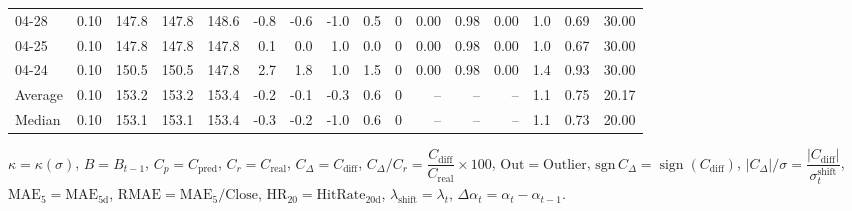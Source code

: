 \begin{threeparttable}
{\begin{tabular}{lrrrrrrrrrrrrrrr}
  04-28 &     0.10 & 147.8 & 147.8 & 148.6 &       -0.8 &           -0.6 &                     -1.0 &                 0.5 &              0 &       0.00 &      0.98 &           0.00 &              1.0 &            0.69 &                  30.00 \\
  04-25 &     0.10 & 147.8 & 147.8 & 147.8 &        0.1 &            0.0 &                      1.0 &                 0.0 &              0 &       0.00 &      0.98 &           0.00 &              1.0 &            0.67 &                  30.00 \\
  04-24 &     0.10 & 150.5 & 150.5 & 147.8 &        2.7 &            1.8 &                      1.0 &                 1.5 &              0 &       0.00 &      0.98 &           0.00 &              1.4 &            0.93 &                  30.00 \\
Average &     0.10 & 153.2 & 153.2 & 153.4 &       -0.2 &           -0.1 &                     -0.3 &                 0.6 &              0 &         -- &        -- &             -- &              1.1 &            0.75 &                  20.17 \\
 Median &     0.10 & 153.1 & 153.1 & 153.4 &       -0.3 &           -0.2 &                     -1.0 &                 0.6 &              0 &         -- &        -- &             -- &              1.1 &            0.73 &                  20.00 \\
\bottomrule
\end{tabular}
}
\begin{tablenotes}\footnotesize
\item $\kappa=\kappa(\sigma)$, $B=B_{t-1}$, $C_p=C_{\text{pred}}$, $C_r=C_{\text{real}}$, $C_\Delta=C_{\text{diff}}$, $C_\Delta/C_r=\dfrac{C_{\text{diff}}}{C_{\text{real}}}\times100$, $\mathrm{Out}=\text{Outlier}$, $\mathrm{sgn}\,C_\Delta=\operatorname{sign}(C_{\text{diff}})$, $|C_\Delta|/\sigma=\dfrac{|C_{\text{diff}}|}{\sigma_t^{\text{shift}}}$, $\mathrm{MAE}_5=\mathrm{MAE}_{5\text{d}}$, $\mathrm{RMAE}= \mathrm{MAE}_5 / \text{Close}$, $\mathrm{HR}_{20}=\mathrm{HitRate}_{20\text{d}}$, 
$\lambda_{\text{shift}}=\lambda_t$, 
$\Delta\alpha_t=\alpha_t-\alpha_{t-1}$.
\end{tablenotes}
\end{threeparttable}
\endgroup

